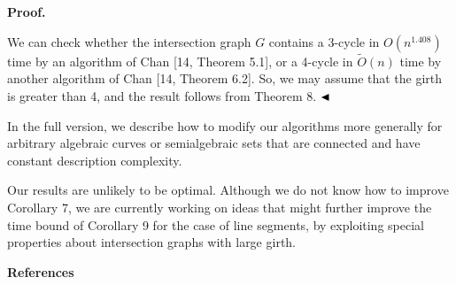 \par
\par
\par
\par\medskip\noindent\textbf{Proof.}\par
We can check whether the intersection graph $G$ contains a 3-cycle in $O(n^{1.408})$ time by an algorithm of Chan [14, Theorem 5.1], or a 4-cycle in $\widetilde{O}(n)$ time by another algorithm of Chan [14, Theorem 6.2]. So, we may assume that the girth is greater than 4, and the result follows from Theorem 8. $\hfill\blacktriangleleft$
\par
\par
In the full version, we describe how to modify our algorithms more generally for arbitrary algebraic curves or semialgebraic sets that are connected and have constant description complexity.
\par
\par
Our results are unlikely to be optimal. Although we do not know how to improve Corollary 7, we are currently working on ideas that might further improve the time bound of Corollary 9 for the case of line segments, by exploiting special properties about intersection graphs with large girth.
\par
\par
\par\medskip\noindent\textbf{References}\par

